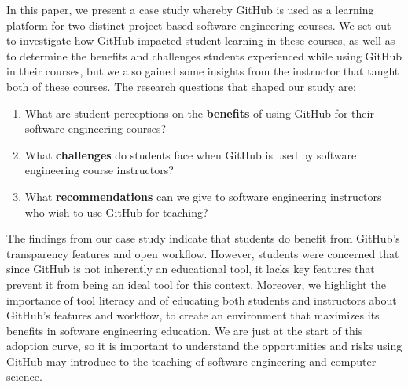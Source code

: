 In this paper, we present a case study whereby GitHub is used as a learning platform for two distinct project-based software engineering courses. We set out to investigate how GitHub impacted student learning in these courses, as well as to determine the benefits and challenges students experienced while using GitHub in their courses, but we also gained some insights from the instructor that taught both of these courses.
%
%
%
The research questions that shaped our study are:%
\begin{enumerate}
\item What are student perceptions on the \textbf{benefits} of using GitHub for their software engineering courses?
\item What \textbf{challenges} do students face when GitHub is used by software engineering course instructors?
\item What \textbf{recommendations} can we give to software engineering instructors who wish to use GitHub for teaching?
\end{enumerate}

The findings from our case study indicate that students do benefit from GitHub's transparency features and open workflow. However, students were concerned  that since GitHub is not inherently an educational tool, it lacks key features that prevent it from being an ideal tool for this context. Moreover, we highlight the importance of tool literacy and of educating both students and instructors about GitHub's features and workflow, to create an environment that maximizes its benefits in software engineering education.  We are just at the start of this adoption curve, so it is important to understand the opportunities and risks using GitHub may introduce to the teaching of software engineering and computer science.  

